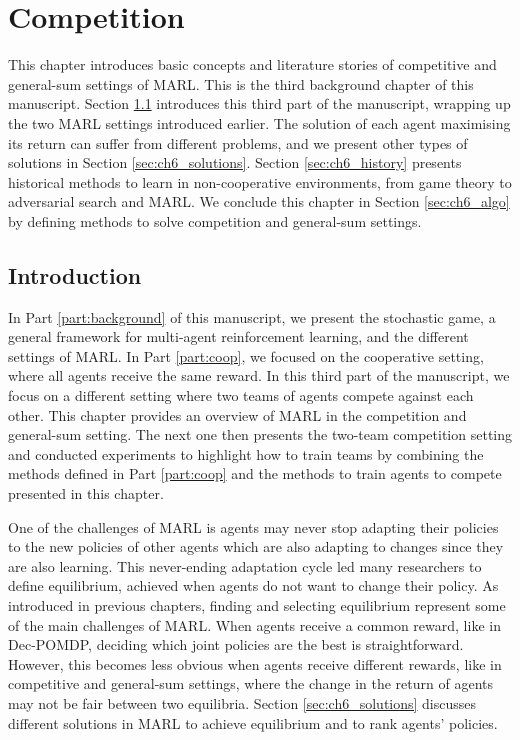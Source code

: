 \chapter{Competition}\label{ch:competition}
\begin{chapter_outline}

This chapter introduces basic concepts and literature stories of competitive and general-sum settings of MARL.
This is the third background chapter of this manuscript.
Section \ref{sec:ch6_intro} introduces this third part of the manuscript, wrapping up the two MARL settings introduced earlier.
The solution of each agent maximising its return can suffer from different problems, and we present other types of solutions in Section \ref{sec:ch6_solutions}.
Section \ref{sec:ch6_history} presents historical methods to learn in non-cooperative environments, from game theory to adversarial search and MARL.
We conclude this chapter in Section \ref{sec:ch6_algo} by defining methods to solve competition and general-sum settings.

\end{chapter_outline}

\section{Introduction}\label{sec:ch6_intro}
In Part \ref{part:background} of this manuscript, we present the stochastic game, a general framework for multi-agent reinforcement learning, and the different settings of MARL.
In Part \ref{part:coop}, we focused on the cooperative setting, where all agents receive the same reward.
In this third part of the manuscript, we focus on a different setting where two teams of agents compete against each other.
This chapter provides an overview of MARL in the competition and general-sum setting.
The next one then presents the two-team competition setting and conducted experiments to highlight how to train teams by combining the methods defined in Part \ref{part:coop} and the methods to train agents to compete presented in this chapter.

One of the challenges of MARL is agents may never stop adapting their policies to the new policies of other agents which are also adapting to changes since they are also learning.
This never-ending adaptation cycle led many researchers to define equilibrium, achieved when agents do not want to change their policy.
As introduced in previous chapters, finding and selecting equilibrium represent some of the main challenges of MARL.
When agents receive a common reward, like in Dec-POMDP, deciding which joint policies are the best is straightforward.
However, this becomes less obvious when agents receive different rewards, like in competitive and general-sum settings, where the change in the return of agents may not be fair between two equilibria.
Section \ref{sec:ch6_solutions} discusses different solutions in MARL to achieve equilibrium and to rank agents' policies.

